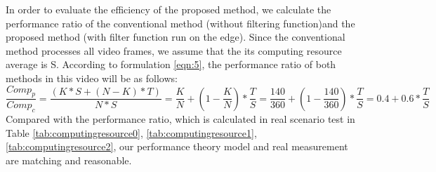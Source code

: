 In order to evaluate the efficiency of the proposed method, we
calculate the performance ratio of the conventional method (without filtering function)and the
proposed method (with filter function run on the edge). Since the conventional method processes all video frames, we assume that the its computing resource average is S. According to formulation \ref{eqn:5}, the performance ratio of both methods in this video will be as follows:\\
\begin{equation}
\label{eqn:10}
\frac{Comp_{p}}{Comp_{c}}=\frac{(K*S+(N-K)*T)}{N*S}=\frac{K}{N} + (1 - \frac{K}{N})*\frac{T}{S}=\frac{140}{360} + (1 - \frac{140}{360})*\frac{T}{S} = 0.4 + 0.6*\frac{T}{S}
\end{equation}
Compared with the performance ratio, which is calculated in real scenario test in Table \ref{tab:computingresource0}, \ref{tab:computingresource1}, \ref{tab:computingresource2}, our performance theory model and real measurement are matching and reasonable.
